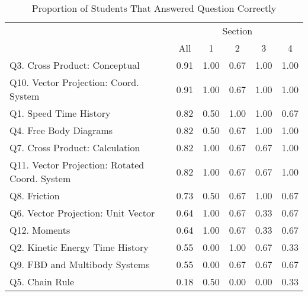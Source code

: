 \documentclass[11pt,letterpaper]{article}\usepackage[]{graphicx}\usepackage[]{color}
\begin{document}
\begin{table}[ht]
\centering
\caption{Proportion of Students That Answered Question Correctly} 
\label{table:questStats}
\begin{tabular}{lccccc}
  \toprule 
 & \multicolumn{5}{c}{Section}\\
 \cline{2-6} 
 & All & 1 & 2 & 3 & 4 \\ 
  \midrule 
Q3. Cross Product: Conceptual & 0.91 & 1.00 & 0.67 & 1.00 & 1.00 \\ 
  Q10. Vector Projection: Coord. System & 0.91 & 1.00 & 0.67 & 1.00 & 1.00 \\ 
  Q1. Speed Time History & 0.82 & 0.50 & 1.00 & 1.00 & 0.67 \\ 
  Q4. Free Body Diagrams & 0.82 & 0.50 & 0.67 & 1.00 & 1.00 \\ 
  Q7. Cross Product: Calculation & 0.82 & 1.00 & 0.67 & 0.67 & 1.00 \\ 
  Q11. Vector Projection: Rotated Coord. System & 0.82 & 1.00 & 0.67 & 0.67 & 1.00 \\ 
  Q8. Friction & 0.73 & 0.50 & 0.67 & 1.00 & 0.67 \\ 
  Q6. Vector Projection: Unit Vector & 0.64 & 1.00 & 0.67 & 0.33 & 0.67 \\ 
  Q12. Moments & 0.64 & 1.00 & 0.67 & 0.33 & 0.67 \\ 
  Q2. Kinetic Energy Time History & 0.55 & 0.00 & 1.00 & 0.67 & 0.33 \\ 
  Q9. FBD and Multibody Systems & 0.55 & 0.00 & 0.67 & 0.67 & 0.67 \\ 
  Q5. Chain Rule & 0.18 & 0.50 & 0.00 & 0.00 & 0.33 \\ 
   \bottomrule 
\end{tabular}
\end{table}


\newpage
\end{document}

